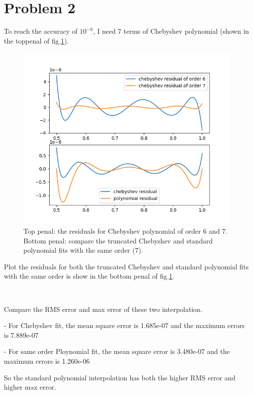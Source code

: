 \documentclass[showpacs, oneside, onecolumn, prl, amsmath, amssymb, nofootinbib, superscriptaddress, notitlepage]{revtex4-1}
\newcommand\bfig{\begin{figure}}
\newcommand\efig{\end{figure}}
\begin{document}
\section{Problem 2}

To reach the accuracy of $10^{-6}$, I need 7 terms of Chebyshev polynomial (shown in the toppenal of fig.\ref{2-2-1}).

\bfig
	\centering
	\includegraphics[scale=1]{2-2.png}
	\caption{Top penal: the residuals for Chebyshev polynomial of order 6 and 7. Bottom penal: compare the truncated Chebyshev and standard polynomial fits with the same order (7).}
	\label{2-2-1}
\efig

Plot the residuals for both the truncated Chebyshev and standard polynomial fits with the same order is show in the bottom penal of fig.\ref{2-2-1}.

~~~~

Compare the RMS error and max error of these two interpolation.

- For Chebyshev fit, the mean square error is 1.685e-07  and the maximum errors is  7.889e-07

- For same order Ploynomial fit, the mean square error is 3.480e-07  and the maximum errors is  1.260e-06

So the standard polynomial interpolation has both the higher RMS error and higher max error.


~~~~

~~~~

\end{document}
